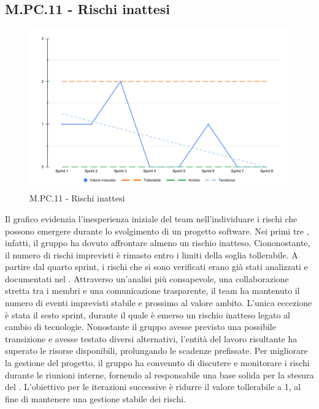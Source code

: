\subsection{M.PC.11 - Rischi inattesi}
\begin{figure}[H]
    \centering
    \includegraphics[width=\textwidth]{assets/rischi_inattesi.pdf}
    \caption{M.PC.11 - Rischi inattesi}
\end{figure}

\par Il grafico evidenzia l’inesperienza iniziale del team nell’individuare i rischi che possono emergere durante lo svolgimento di un progetto software. Nei primi tre , infatti, il gruppo ha dovuto affrontare almeno un rischio inatteso. Ciononostante, il numero di rischi imprevisti è rimasto entro i limiti della soglia tollerabile. A partire dal quarto sprint, i rischi che si sono verificati erano già stati analizzati e documentati nel \PdP. Attraverso un’analisi più consapevole, una collaborazione stretta tra i membri e una comunicazione trasparente, il team ha mantenuto il numero di eventi imprevisti stabile e prossimo al valore ambito. L'unica eccezione è stata il sesto sprint, durante il quale è emerso un rischio inatteso legato al cambio di tecnologie. Nonostante il gruppo avesse previsto una possibile transizione e avesse testato diversi  alternativi, l’entità del lavoro risultante ha superato le risorse disponibili, prolungando le scadenze prefissate. Per migliorare la gestione del progetto, il gruppo ha convenuto di discutere e monitorare i rischi durante le riunioni interne, fornendo al responsabile una base solida per la stesura del \PdP. L'obiettivo per le iterazioni successive è ridurre il valore tollerabile a 1, al fine di mantenere una gestione stabile dei rischi.
